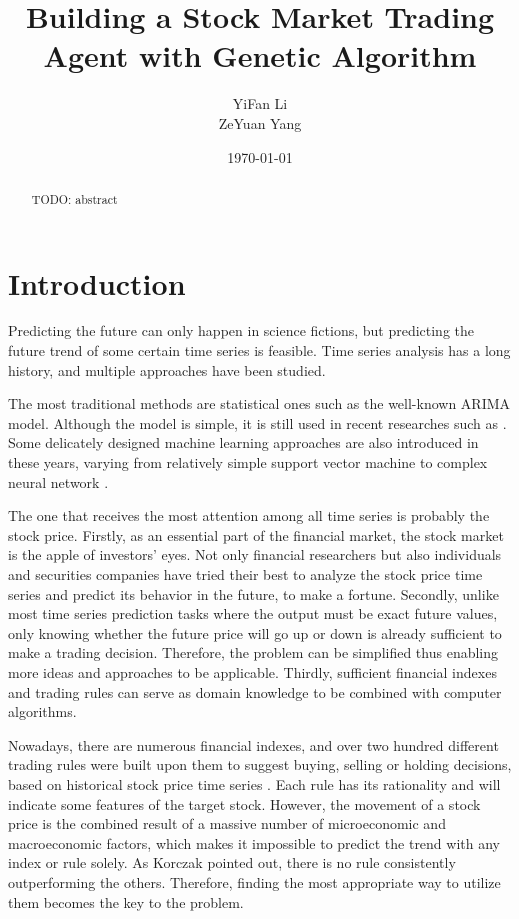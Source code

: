 \documentclass{article}
\title{Building a Stock Market Trading Agent with Genetic Algorithm}
\author{YiFan Li\\ZeYuan Yang}
\date{\today}
\begin{document}
\maketitle
{}


\begin{abstract}
	TODO: abstract
\end{abstract}

\section{Introduction}

Predicting the future can only happen in science fictions,
but predicting the future trend of some certain time series is feasible.
Time series analysis has a long history, and multiple approaches have been studied.

The most traditional methods are statistical ones such as the well-known ARIMA model.
Although the model is simple, it is still used in recent researches such as \cite{arima-bus-travel}.
Some delicately designed machine learning approaches are also introduced in these years,
varying from relatively simple support vector machine \cite{support-vector-machine}
to complex neural network \cite{time-series-prediction-and-neural-networks}.

The one that receives the most attention among all time series is probably the stock price.
Firstly, as an essential part of the financial market, the stock market is the apple of investors' eyes.
Not only financial researchers but also individuals and securities companies have
tried their best to analyze the stock price time series and predict its behavior in the future,
to make a fortune.
Secondly, unlike most time series prediction tasks where the output must be exact future values,
only knowing whether the future price will go up or down is already sufficient to make a trading decision.
Therefore, the problem can be simplified thus enabling more ideas and approaches to be applicable.
Thirdly, sufficient financial indexes and trading rules
can serve as domain knowledge to be combined with computer algorithms.

Nowadays, there are numerous financial indexes, and over two hundred different trading rules were
built upon them to suggest buying, selling or holding decisions,
based on historical stock price time series \cite{stock-timing-using-genetic-algorithms}.
Each rule has its rationality and will indicate some features of the target stock.
However, the movement of a stock price is the combined result of a massive number of microeconomic and macroeconomic factors,
which makes it impossible to predict the trend with any index or rule solely.
As Korczak \cite{stock-timing-using-genetic-algorithms} pointed out,
there is no rule consistently outperforming the others.
Therefore, finding the most appropriate way to utilize them becomes the key to the problem.
\end{document}
